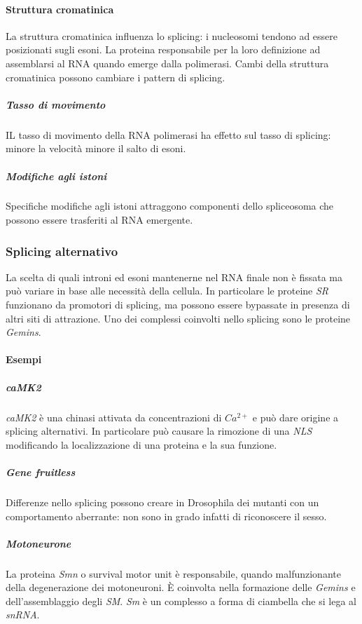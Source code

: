 			\paragraph{Struttura cromatinica}
			La struttura cromatinica influenza lo splicing: i nucleosomi tendono ad essere posizionati sugli esoni.
			La proteina responsabile per la loro definizione ad assemblarsi al RNA quando emerge dalla polimerasi.
			Cambi della struttura cromatinica possono cambiare i pattern di splicing.

				\subparagraph{Tasso di movimento}
				IL tasso di movimento della RNA polimerasi ha effetto sul tasso di splicing: minore la velocit\`a minore il salto di esoni.

				\subparagraph{Modifiche agli istoni}
				Specifiche modifiche agli istoni attraggono componenti dello spliceosoma che possono essere trasferiti al RNA emergente.

		\subsubsection{Splicing alternativo}
		La scelta di quali introni ed esoni mantenerne nel RNA finale non \`e fissata ma pu\`o variare in base alle necessit\`a della cellula.
		In particolare le proteine \emph{SR} funzionano da promotori di splicing, ma possono essere bypassate in presenza di altri siti di attrazione.
		Uno dei complessi coinvolti nello splicing sono le proteine \emph{Gemins}.

			\paragraph{Esempi}

				\subparagraph{\emph{caMK2}}
				\emph{caMK2} \`e una chinasi attivata da concentrazioni di \emph{$Ca^{2+}$} e pu\`o dare origine a splicing alternativi.
				In particolare pu\`o causare la rimozione di una \emph{NLS} modificando la localizzazione di una proteina e la sua funzione.

				\subparagraph{Gene fruitless}
				Differenze nello splicing possono creare in Drosophila dei mutanti con un comportamento aberrante: non sono in grado infatti di riconoscere il sesso.

				\subparagraph{Motoneurone}
				La proteina \emph{Smn} o survival motor unit \`e responsabile, quando malfunzionante della degenerazione dei motoneuroni.
				\`E coinvolta nella formazione delle \emph{Gemins} e dell'assemblaggio degli \emph{SM}.
				\emph{Sm} \`e un complesso a forma di ciambella che si lega al \emph{snRNA}.

